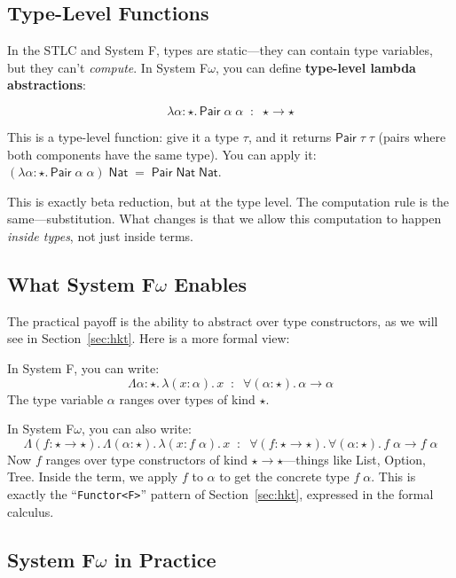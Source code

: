 \documentclass[11pt,a4paper]{article}
\theoremstyle{definition}
\newcommand{\lam}{\lambda}
\newcommand{\Lam}{\Lambda}
\begin{document}
\subsection{Type-Level Functions}

In the STLC and System F, types are static---they can contain type variables,
but they can't \emph{compute}. In System F$\omega$, you can define
\textbf{type-level lambda abstractions}:

\[
  \lam\alpha{:}\star.\, \textsf{Pair}\;\alpha\;\alpha
  \;\;:\;\; \star \to \star
\]

This is a type-level function: give it a type $\tau$, and it returns
$\textsf{Pair}\;\tau\;\tau$ (pairs where both components have the same type).
You can apply it: $(\lam\alpha{:}\star.\, \textsf{Pair}\;\alpha\;\alpha)\;
\textsf{Nat} \;=\; \textsf{Pair}\;\textsf{Nat}\;\textsf{Nat}$.

This is exactly beta reduction, but at the type level. The computation rule is
the same---substitution. What changes is that we allow this computation to
happen \emph{inside types}, not just inside terms.

\subsection{What System F$\omega$ Enables}

The practical payoff is the ability to abstract over type constructors, as we
will see in Section~\ref{sec:hkt}. Here is a more formal view:

In System F, you can write:
\[
  \Lam\alpha{:}\star.\, \lam(x:\alpha).\, x
  \;\;:\;\; \forall(\alpha{:}\star).\, \alpha \to \alpha
\]
The type variable $\alpha$ ranges over types of kind $\star$.

In System F$\omega$, you can also write:
\[
  \Lam(f{:}\star{\to}\star).\, \Lam(\alpha{:}\star).\, \lam(x:f\;\alpha).\, x
  \;\;:\;\; \forall(f{:}\star{\to}\star).\, \forall(\alpha{:}\star).\, f\;\alpha \to f\;\alpha
\]
Now $f$ ranges over type constructors of kind $\star \to \star$---things like
\textsf{List}, \textsf{Option}, \textsf{Tree}. Inside the term, we apply $f$
to $\alpha$ to get the concrete type $f\;\alpha$. This is exactly the
``\texttt{Functor<F>}'' pattern of Section~\ref{sec:hkt}, expressed in the formal
calculus.

\subsection{System F$\omega$ in Practice}
\end{document}
